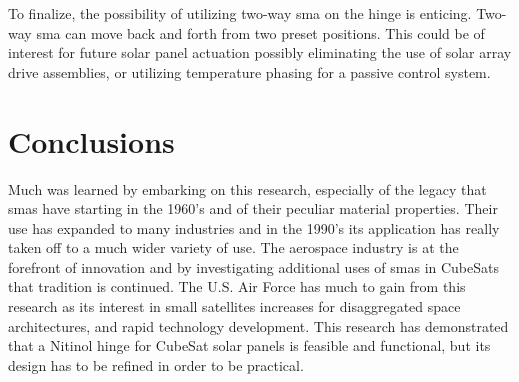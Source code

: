 To finalize, the possibility of utilizing two-way \gls{sma} on the hinge is enticing. Two-way \gls{sma} can move back and forth from two preset positions. This could be of interest for future solar panel actuation possibly eliminating the use of solar array drive assemblies, or utilizing temperature phasing for a passive control system. 





\section{Conclusions}
Much was learned by embarking on this research, especially of the legacy that \gls{sma}s have starting in the 1960's and of their peculiar material properties. Their use has expanded to many industries and in the 1990's its application has really taken off to a much wider variety of use. The aerospace industry is at the forefront of innovation and by investigating additional uses of \gls{sma}s in CubeSats that tradition is continued. The U.S. Air Force has much to gain from this research as its interest in small satellites increases for disaggregated space architectures, and rapid technology development. This research has demonstrated that a Nitinol hinge for CubeSat solar panels is feasible and functional, but its design has to be refined in order to be practical.    

    
